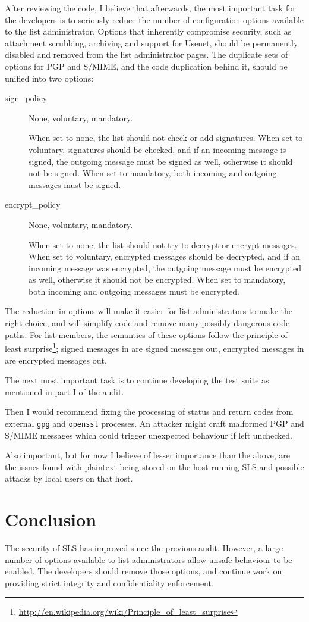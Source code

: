 \documentclass[a4]{article}
\newcommand{\file}[1]{\texttt{#1}}
\begin{document}
After reviewing the code, I believe that afterwards, the most important task for the developers is to
seriously reduce the number of configuration options available to the list administrator.
Options that inherently compromise security, such as attachment scrubbing, archiving and support for Usenet,
should be permanently disabled and removed from the list administrator pages.
The duplicate sets of options for PGP and S/MIME, and the code duplication behind it,
should be unified into two options:
\begin{description}
\item[sign\_policy] None, voluntary, mandatory.

When set to none, the list should not check or add signatures.
When set to voluntary, signatures should be checked,
and if an incoming message is signed, the outgoing message must be signed as well,
otherwise it should not be signed.
When set to mandatory, both incoming and outgoing messages must be signed.

\item[encrypt\_policy] None, voluntary, mandatory.

When set to none, the list should not try to decrypt or encrypt messages.
When set to voluntary, encrypted messages should be decrypted,
and if an incoming message was encrypted, the outgoing message must be encrypted as well,
otherwise it should not be encrypted.
When set to mandatory, both incoming and outgoing messages must be encrypted.
\end{description}
The reduction in options will make it easier for list administrators to make the right choice,
and will simplify code and remove many possibly dangerous code paths.
For list members, the semantics of these options follow the principle of least
surprise\footnote{\url{http://en.wikipedia.org/wiki/Principle_of_least_surprise}};
signed messages in are signed messages out, encrypted messages in are encrypted messages out.

The next most important task is to continue developing the test suite as mentioned in part I of the audit.

Then I would recommend fixing the processing of status and return codes from external \file{gpg} and \file{openssl} processes.
An attacker might craft malformed PGP and S/MIME messages which could trigger unexpected behaviour if left unchecked.

Also important, but for now I believe of lesser importance than the above,
are the issues found with plaintext being stored on the host running SLS
and possible attacks by local users on that host.

\section{Conclusion}\label{sec:conclusion}

The security of SLS has improved since the previous audit.
However, a large number of options available to list administrators
allow unsafe behaviour to be enabled.
The developers should remove those options,
and continue work on providing strict integrity and confidentiality enforcement.
\end{document}
